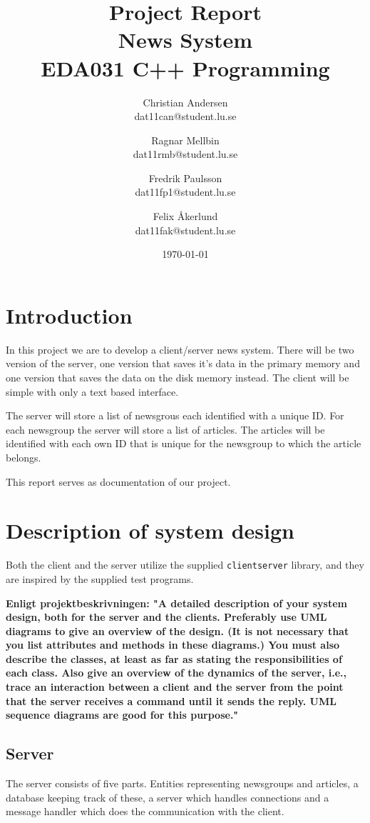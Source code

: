 \documentclass[a4paper]{article}
\title{Project Report \\ News System  \\ EDA031 C++ Programming}
\date{\today}
\author{Christian Andersen \\ dat11can@student.lu.se \and Ragnar Mellbin \\ dat11rmb@student.lu.se \and Fredrik Paulsson \\ dat11fp1@student.lu.se
\and Felix Åkerlund \\ dat11fak@student.lu.se}
\begin{document}
\maketitle


\section{Introduction}
In this project we are to develop a client/server news system. There will be two version of the server, one version that saves it's data in the primary memory and one version that saves the data on the disk memory instead. The client will be simple with only a text based interface.

The server will store a list of newsgrous each identified with a unique ID. For each newsgroup the server will store a list of articles. The articles will be identified with each own ID that is unique for the newsgroup to which the article belongs.

This report serves as documentation of our project.

\section{Description of system design}
Both the client and the server utilize the supplied \texttt{clientserver} library, and they are inspired by the supplied test programs.

\textbf{Enligt projektbeskrivningen: "A detailed description of your system design, both for the server and the clients. Preferably
use UML diagrams to give an overview of the design. (It is not necessary that you list
attributes and methods in these diagrams.) You must also describe the classes, at least as
far as stating the responsibilities of each class. Also give an overview of the dynamics of the server, i.e., trace an interaction between a
client and the server from the point that the server receives a command until it sends the
reply. UML sequence diagrams are good for this purpose."}

\subsection{Server}

The server consists of five parts. Entities representing newsgroups and articles, a database keeping track of these, a server which handles connections and a message handler which does the communication with the client.
\end{document}
